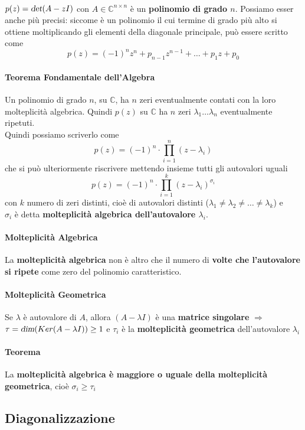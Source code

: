 \documentclass[10pt]{book}
\begin{document}
\paragraph{} $p(z) = \textsl{det}(A - zI)$ con $A \in \mathbb{C}^{n \times n}$ è un \textbf{polinomio di grado $n$}. Possiamo esser anche più precisi: siccome è un polinomio il cui termine di grado più alto si ottiene moltiplicando gli elementi della diagonale principale, può essere scritto come $$p(z) = (-1)^n z^n + p_{n-1} z^{n-1} + \ldots + p_1 z + p_0$$
\paragraph{Teorema Fondamentale dell'Algebra} Un polinomio di grado $n$, su $\mathbb{C}$, ha $n$ zeri eventualmente contati con la loro molteplicità algebrica. Quindi $p(z)$ su $\mathbb{C}$ ha $n$ zeri $\lambda_1 \ldots \lambda_n$ eventualmente ripetuti.\\
Quindi possiamo scriverlo come $$p(z) = (-1)^n \cdot \prod_{i = 1}^n (z - \lambda_i)$$
che si può ulteriormente riscrivere mettendo insieme tutti gli autovalori uguali
$$p(z) = (-1)^n \cdot \prod_{i = 1}^k (z - \lambda_i)^{\sigma_i}$$ con $k$ numero di zeri distinti, cioè di autovalori distinti ($\lambda_1 \neq \lambda_2 \neq \ldots \neq \lambda_k$) e\\$\sigma_i$ è detta \textbf{molteplicità algebrica dell'autovalore $\lambda_i$}.\\
\paragraph{Molteplicità Algebrica} La \textbf{molteplicità algebrica} non è altro che il numero di \textbf{volte che l'autovalore si ripete} come zero del polinomio caratteristico.
\paragraph{Molteplicità Geometrica} Se $\lambda$ è autovalore di $A$, allora $(A - \lambda I)$ è una \textbf{matrice singolare} $\Rightarrow$\\$\tau = \textsl{dim}(Ker(A - \lambda I)) \geq 1$ e $\tau_i$ è la \textbf{molteplicità geometrica} dell'autovalore $\lambda_i$
\paragraph{Teorema} La \textbf{molteplicità algebrica è maggiore o uguale della molteplicità geometrica}, cioè $\sigma_i \geq \tau_i$
\subsection{Diagonalizzazione}
\end{document}
